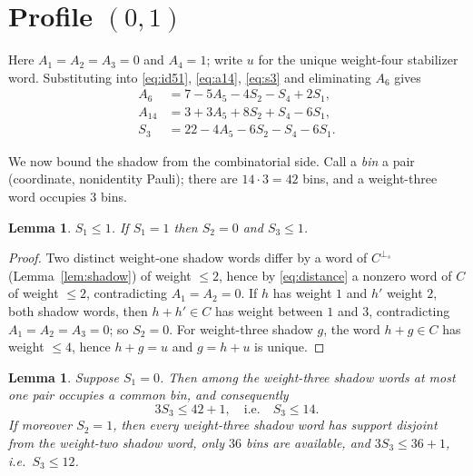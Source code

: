 \documentclass[11pt]{amsart}
\newtheorem{lemma}[theorem]{Lemma}
\theoremstyle{definition}
\theoremstyle{remark}
\newcommand{\perps}{{\perp_s}}
\begin{document}
\section{\texorpdfstring{Profile $(0,1)$}{Profile (0,1)}}\label{sec:p01}

Here $A_1=A_2=A_3=0$ and $A_4=1$; write $u$ for the unique weight-four
stabilizer word.  Substituting into \eqref{eq:id51},
\eqref{eq:a14}, \eqref{eq:s3} and eliminating $A_6$ gives
\begin{align}
A_6&=7-5A_5-4S_2-S_4+2S_1, \label{eq:p01-a6}\\
A_{14}&=3+3A_5+8S_2+S_4-6S_1, \label{eq:p01-a14}\\
S_3&=22-4A_5-6S_2-S_4-6S_1. \label{eq:p01-s3}
\end{align}

We now bound the shadow from the combinatorial side.  Call a
\emph{bin} a pair (coordinate, nonidentity Pauli); there are
$14\cdot3=42$ bins, and a weight-three word occupies $3$ bins.

\begin{lemma}\label{lem:p01-s1}
$S_1\le 1$.  If $S_1=1$ then $S_2=0$ and $S_3\le1$.
\end{lemma}

\begin{proof}
Two distinct weight-one shadow words differ by a word of $C^{\perps}$
(Lemma~\ref{lem:shadow}) of weight $\le2$, hence by
\eqref{eq:distance} a nonzero word of $C$ of weight $\le2$, contradicting
$A_1=A_2=0$.  If $h$ has weight $1$ and $h'$ weight $2$, both shadow
words, then $h+h'\in C$ has weight between $1$ and $3$, contradicting
$A_1=A_2=A_3=0$; so $S_2=0$.  For weight-three shadow $g$, the word
$h+g\in C$ has weight $\le4$, hence $h+g=u$ and $g=h+u$ is unique.
\end{proof}

\begin{lemma}\label{lem:p01-bins}
Suppose $S_1=0$.  Then among the weight-three shadow words at most one
pair occupies a common bin, and consequently
\[
3S_3\le 42+1,\quad\text{i.e.}\quad S_3\le 14 .
\]
If moreover $S_2=1$, then every weight-three shadow word has support
disjoint from the weight-two shadow word, only $36$ bins are available,
and $3S_3\le 36+1$, i.e.\ $S_3\le 12$.
\end{lemma}
\end{document}
